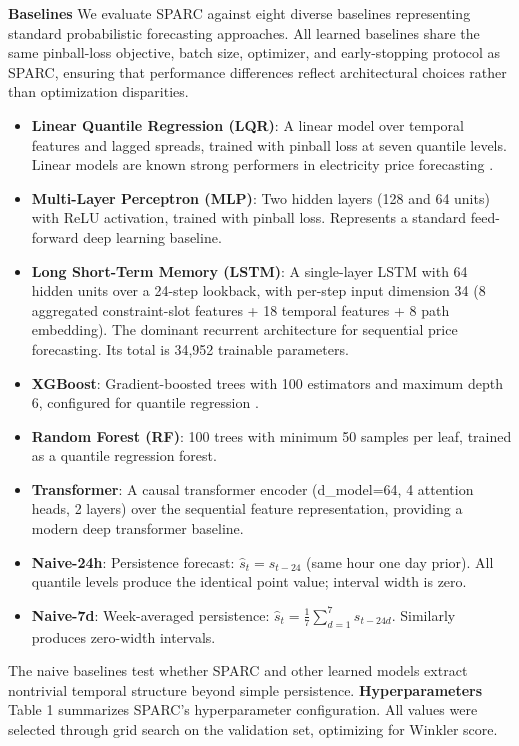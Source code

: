 \documentclass[twoside]{article}
\begin{document}
\textbf{Baselines}
We evaluate SPARC against eight diverse baselines representing standard probabilistic forecasting approaches. All learned baselines share the same pinball-loss objective, batch size, optimizer, and early-stopping protocol as SPARC, ensuring that performance differences reflect architectural choices rather than optimization disparities.
\begin{itemize}
  \item \textbf{Linear Quantile Regression (LQR)}: A linear model over temporal features and lagged spreads, trained with pinball loss at seven quantile levels. Linear models are known strong performers in electricity price forecasting \cite{lago2020forecasting}.
  \item \textbf{Multi-Layer Perceptron (MLP)}: Two hidden layers (128 and 64 units) with ReLU activation, trained with pinball loss. Represents a standard feed-forward deep learning baseline.
  \item \textbf{Long Short-Term Memory (LSTM)}: A single-layer LSTM with 64 hidden units over a 24-step lookback, with per-step input dimension 34 (8 aggregated constraint-slot features + 18 temporal features + 8 path embedding). The dominant recurrent architecture for sequential price forecasting. Its total is 34,952 trainable parameters.
  \item \textbf{XGBoost}: Gradient-boosted trees with 100 estimators and maximum depth 6, configured for quantile regression \cite{li2022probabilistic}.
  \item \textbf{Random Forest (RF)}: 100 trees with minimum 50 samples per leaf, trained as a quantile regression forest.
  \item \textbf{Transformer}: A causal transformer encoder (d\_model=64, 4 attention heads, 2 layers) over the sequential feature representation, providing a modern deep transformer baseline.
  \item \textbf{Naive-24h}: Persistence forecast: $\hat{s}_t = s_{t-24}$ (same hour one day prior). All quantile levels produce the identical point value; interval width is zero.
  \item \textbf{Naive-7d}: Week-averaged persistence: $\hat{s}_t = \frac{1}{7} \sum_{d=1}^7 s_{t-24d}$. Similarly produces zero-width intervals.
\end{itemize}
The naive baselines test whether SPARC and other learned models extract nontrivial temporal structure beyond simple persistence.
\textbf{Hyperparameters}
Table 1 summarizes SPARC's hyperparameter configuration. All values were selected through grid search on the validation set, optimizing for Winkler score.
\end{document}
